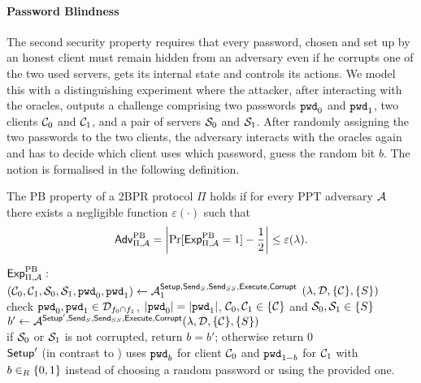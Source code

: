\paragraph{Password Blindness}
The second security property requires that every password, chosen and set up by an honest client must remain hidden from an adversary even if he corrupts one of the two used servers, gets its internal state and controls its actions.
We model this with a distinguishing experiment where the attacker, after interacting with the oracles, outputs a challenge comprising two passwords $\mathtt{pwd}_0$ and $\mathtt{pwd}_1$, two clients $\mathcal{C}_0$ and $\mathcal{C}_1$, and a pair of servers $\mathcal{S}_0$ and $\mathcal{S}_1$.
After randomly assigning the two passwords to the two clients, the adversary interacts with the oracles again and has to decide which client uses which password, \ie guess the random bit $b$.
The notion is formalised in the following definition.

\begin{definition}\label{def:zk}
The \acl{PB} property of a \ac{2BPR} protocol $\Pi$ holds if for every \ac{PPT} adversary $\mathcal{A}$ there exists a negligible function $\varepsilon(\cdot)$ such that
\[ \mathsf{Adv}_{\Pi, \mathcal{A}}^{\mathrm{PB}}=\left|\Pr[\mathsf{Exp}_{\Pi, \mathcal{A}}^{\mathrm{PB}}=1]-\frac{1}{2}\right|\leq\varepsilon(\lambda). \]

\noindent
$\mathsf{Exp}_{\Pi, \mathcal{A}}^{\mathrm{PB}}:$ \\
\hspace*{2em} $(\mathcal{C}_0, \mathcal{C}_1, \mathcal{S}_0,\mathcal{S}_1,\mathtt{pwd}_0,\mathtt{pwd}_1)\gets\mathcal{A}_1^{\mathsf{Setup},\mathsf{Send}_S,\mathsf{Send}_{SS}, \mathsf{Execute},\mathsf{Corrupt}}$ $(\lambda,\mathcal{D},\{\mathcal{C}\},\{S\})$ \\
\hspace*{2em} check $\mathtt{pwd}_0,\mathtt{pwd}_1\in\mathcal{D}_{f_0\cap f_1}$, $|\mathtt{pwd}_0|=|\mathtt{pwd}_1|$, $\mathcal{C}_0,\mathcal{C}_1\in\{\mathcal{C}\}$ and $\mathcal{S}_0,\mathcal{S}_1\in\{S\}$\\
\hspace*{2em} $ b'\gets\mathcal{A}^{\mathsf{Setup}',\mathsf{Send}_S,\mathsf{Send}_{SS}, \mathsf{Execute},\mathsf{Corrupt}}(\lambda,\mathcal{D},\{\mathcal{C}\},\{S\})$\\
\hspace*{2em} if $\mathcal{S}_0$ or $\mathcal{S}_1$ is not corrupted, return $b=b'$; otherwise return $0$ \\

\noindent
$\mathsf{Setup}'$ (in contrast to \Setup) uses $\mathtt{pwd}_b$ for client $\mathcal{C}_0$ and $\mathtt{pwd}_{1-b}$ for $\mathcal{C}_1$ with $b\in_R\{0,1\}$ instead of choosing a random password or using the provided one.
\eod
\end{definition}


